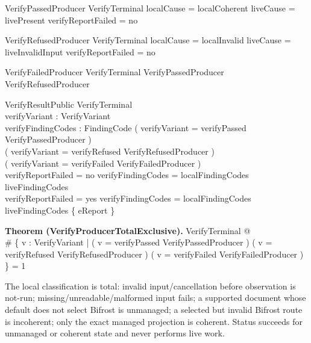 \documentclass{article}
\makeatletter
\newenvironment{theorem}[1]{\medskip\noindent\textbf{Theorem (#1).}\@nameuse{zed}}{\@nameuse{endzed}}
\makeatother
\begin{document}
\begin{schema}{VerifyPassedProducer}
	VerifyTerminal
	\where
	localCause = localCoherent \land liveCause = livePresent \land
	verifyReportFailed = no
\end{schema}

\begin{schema}{VerifyRefusedProducer}
	VerifyTerminal
	\where
	localCause = localInvalid \land liveCause = liveInvalidInput \land
	verifyReportFailed = no
\end{schema}

\begin{schema}{VerifyFailedProducer}
	VerifyTerminal
	\where
	\lnot VerifyPassedProducer \land \lnot VerifyRefusedProducer
\end{schema}

\begin{schema}{VerifyResultPublic}
	VerifyTerminal \\
	verifyVariant : VerifyVariant \\
	verifyFindingCodes : \power FindingCode
	\where
	( verifyVariant = verifyPassed \iff VerifyPassedProducer ) \\
	( verifyVariant = verifyRefused \iff VerifyRefusedProducer ) \\
	( verifyVariant = verifyFailed \iff VerifyFailedProducer ) \\
	verifyReportFailed = no \implies verifyFindingCodes =
	localFindingCodes \cup liveFindingCodes \\
	verifyReportFailed = yes \implies verifyFindingCodes =
	localFindingCodes \cup liveFindingCodes \cup \{ eReport \}
\end{schema}

\begin{theorem}{VerifyProducerTotalExclusive}
	\forall VerifyTerminal @ \\
	\# \{ v : VerifyVariant |
	( v = verifyPassed \land VerifyPassedProducer ) \lor
	( v = verifyRefused \land VerifyRefusedProducer ) \lor
	( v = verifyFailed \land VerifyFailedProducer ) \} = 1
\end{theorem}

The local classification is total: invalid input/cancellation before observation
is not-run; missing/unreadable/malformed input fails; a supported document whose
default does not select Bifrost is unmanaged; a selected but invalid Bifrost
route is incoherent; only the exact managed projection is coherent.  Status
succeeds for unmanaged or coherent state and never performs live work.
\end{document}
